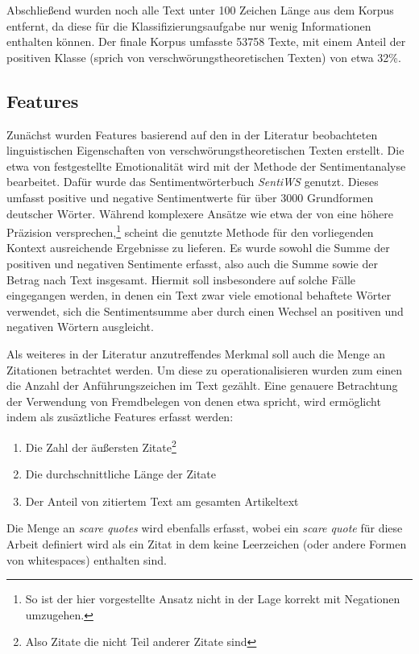 Abschließend wurden noch alle Text unter 100 Zeichen Länge aus dem Korpus entfernt, da diese für die Klassifizierungsaufgabe nur wenig Informationen enthalten können. Der finale Korpus umfasste 53758 Texte, mit einem Anteil der positiven Klasse (sprich von verschwörungstheoretischen Texten) von etwa 32\%.

\subsection{Features}

Zunächst wurden Features basierend auf den in der Literatur beobachteten linguistischen Eigenschaften von verschwörungstheoretischen Texten erstellt.
Die etwa von \textcite*[10]{miller_2002} festgestellte Emotionalität wird mit der Methode der Sentimentanalyse bearbeitet.
Dafür wurde das Sentimentwörterbuch \textit{SentiWS} \parencite[][]{sentiws} genutzt.
Dieses umfasst positive und negative Sentimentwerte für über 3000 Grundformen deutscher Wörter.
Während komplexere Ansätze wie etwa der von \textcite[]{ml_sentiment} eine höhere Präzision versprechen,\footnote{So ist der hier vorgestellte Ansatz nicht in der Lage korrekt mit Negationen umzugehen.} scheint die genutzte Methode für den vorliegenden Kontext ausreichende Ergebnisse zu lieferen.
Es wurde sowohl die Summe der positiven und negativen Sentimente erfasst, also auch die Summe sowie der Betrag nach Text insgesamt.
Hiermit soll insbesondere auf solche Fälle eingegangen werden, in denen ein Text zwar viele emotional behaftete Wörter verwendet, sich die Sentimentsumme aber durch einen Wechsel an positiven und negativen Wörtern ausgleicht.

Als weiteres in der Literatur anzutreffendes Merkmal soll auch die Menge an Zitationen betrachtet werden.
Um diese zu operationalisieren wurden zum einen die Anzahl der Anführungszeichen im Text gezählt.
Eine genauere Betrachtung der Verwendung von Fremdbelegen von denen etwa \textcite[235]{schafer_2018} spricht, wird ermöglicht indem als zusäztliche Features erfasst werden:
\begin{enumerate}
    \item Die Zahl der äußersten Zitate\footnote{Also Zitate die nicht Teil anderer Zitate sind}
    \item Die durchschnittliche Länge der Zitate
    \item Der Anteil von zitiertem Text am gesamten Artikeltext
\end{enumerate}

Die Menge an \textit{scare quotes} wird ebenfalls erfasst, wobei ein \textit{scare quote} für diese Arbeit definiert wird als ein Zitat in dem keine Leerzeichen (oder andere Formen von whitespaces) enthalten sind.

